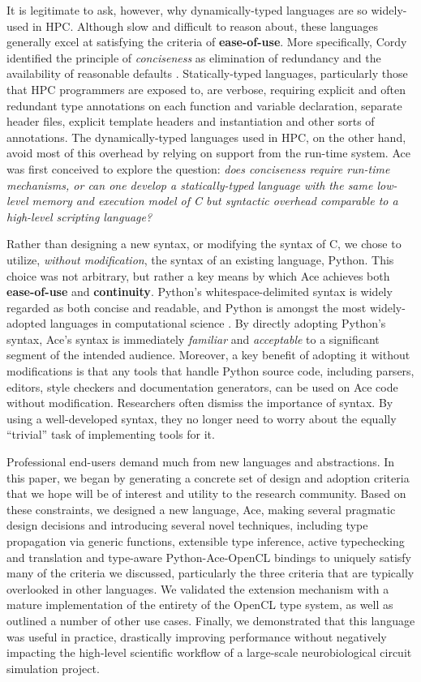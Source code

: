 \documentclass[9pt,preprint]{sigplanconf}
\begin{document}
It is legitimate to ask, however, why dynamically-typed languages are so widely-used in HPC. Although slow and difficult to reason about, these languages generally excel at satisfying the criteria of \textbf{ease-of-use}. More specifically, Cordy identified the principle of \emph{conciseness} as elimination of
redundancy and the availability of reasonable defaults \cite{cordy1992hints}. Statically-typed languages, particularly those that HPC programmers are exposed to, are verbose, requiring explicit and often redundant type annotations on each function and variable declaration, separate header files, explicit template headers and  instantiation and other sorts of annotations.  The dynamically-typed languages used in HPC, on the other hand, avoid most of this overhead by relying on support from the run-time system. Ace was first conceived to explore the question: \emph{does conciseness require run-time mechanisms, or can one develop a statically-typed language with the same low-level memory and execution model of C but syntactic overhead comparable to a high-level scripting language? }

Rather than designing a new syntax, or modifying the syntax of C, we chose to utilize, \emph{without modification}, the syntax of an existing language, Python. This choice was not arbitrary, but rather a key means by which Ace achieves both \textbf{ease-of-use} and \textbf{continuity}. Python's whitespace-delimited syntax is widely regarded as both concise and readable, and Python is amongst the most widely-adopted languages in computational science \cite{oliphant2007python}. By directly adopting Python's syntax, Ace's syntax is immediately \emph{familiar} and \emph{acceptable} to a significant segment of the intended audience. Moreover, a key benefit of adopting it without modifications is that any {tools} that handle Python source code, including parsers, editors, style checkers and documentation generators, can be used on Ace code without modification. Researchers often dismiss the importance of syntax. By using a well-developed syntax, they no longer need to worry about the equally ``trivial'' task of implementing tools for it.

Professional end-users demand much from new languages and abstractions. In this paper, we began by generating a concrete set of design and adoption criteria that we hope will be of interest and utility to the research community. Based on these constraints, we designed a new language, Ace, making several pragmatic design decisions and introducing several novel techniques, including type propagation via generic functions, extensible type inference, active typechecking and translation and type-aware Python-Ace-OpenCL bindings to uniquely satisfy many of the criteria we discussed, particularly the three criteria that are typically overlooked in other languages. We validated the extension mechanism with a mature implementation of  the entirety of the OpenCL type system, as well as outlined a number of other use cases. Finally, we demonstrated that this language was useful in practice, drastically improving performance without negatively impacting the high-level scientific workflow of a large-scale neurobiological circuit simulation project. 
\end{document}
